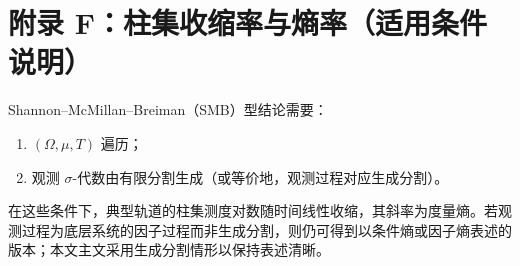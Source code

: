 \section{附录 F：柱集收缩率与熵率（适用条件说明）}
\label{app:smb-conditions}

Shannon--McMillan--Breiman（SMB）型结论需要：
\begin{enumerate}
  \item $(\Omega,\mu,T)$ 遍历；
  \item 观测 $\sigma$-代数由有限分割生成（或等价地，观测过程对应生成分割）。
\end{enumerate}

在这些条件下，典型轨道的柱集测度对数随时间线性收缩，其斜率为度量熵。若观测过程为底层系统的因子过程而非生成分割，则仍可得到以条件熵或因子熵表述的版本；本文主文采用生成分割情形以保持表述清晰。

